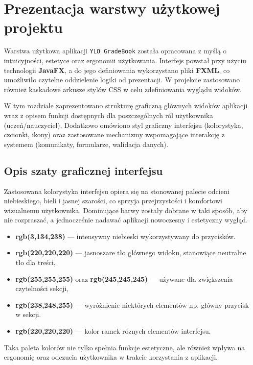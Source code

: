 \chapter{Prezentacja warstwy użytkowej projektu}
\label{cha:prezentacja}


Warstwa użytkowa aplikacji \texttt{YLO GradeBook} została opracowana z myślą o intuicyjności, estetyce oraz ergonomii użytkowania. Interfejs powstał przy użyciu technologii \textbf{JavaFX}, a do jego definiowania wykorzystano pliki \textbf{FXML}, co umożliwiło czytelne oddzielenie logiki od prezentacji. W projekcie zastosowano również kaskadowe arkusze stylów CSS w celu zdefiniowania wyglądu widoków.

W tym rozdziale zaprezentowano strukturę graficzną głównych widoków aplikacji wraz z opisem funkcji dostępnych dla poszczególnych ról użytkownika (uczeń/nauczyciel). Dodatkowo omówiono styl graficzny interfejsu (kolorystyka, czcionki, ikony) oraz zastosowane mechanizmy wspomagające interakcję z systemem (komunikaty, formularze, walidacja danych).

\section{Opis szaty graficznej interfejsu}
Zastosowana kolorystyka interfejsu opiera się na stonowanej palecie odcieni niebieskiego, bieli i jasnej szarości, co sprzyja przejrzystości i komfortowi wizualnemu użytkownika. Dominujące barwy zostały dobrane w taki sposób, aby nie rozpraszać, a jednocześnie nadawać aplikacji nowoczesny i estetyczny wygląd.

\begin{itemize}
    \item \textbf{rgb(3,134,238)} — intensywny niebieski wykorzystywany do przycisków.
    \item \textbf{rgb(220,220,220)} — jasnoszare tło głównego widoku, stanowiące neutralne tło dla treści,
    \item \textbf{rgb(255,255,255)} oraz \textbf{rgb(245,245,245)} — używane dla zwiększenia czytelności sekcji,
    \item \textbf{rgb(238,248,255)} — wyróżnienie niektórych elementów np. główny przycisk w sekcji.
    \item \textbf{rgb(220,220,220)} — kolor ramek róznych elementów interfejsu.
\end{itemize}

Taka paleta kolorów nie tylko spełnia funkcje estetyczne, ale również wpływa na ergonomię oraz odczucia użytkownika w trakcie korzystania z aplikacji.

